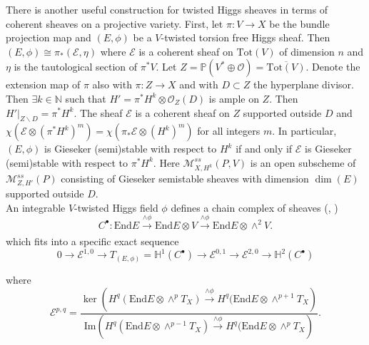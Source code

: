 \documentclass[12pt]{amsart}
\theoremstyle{definition}
\theoremstyle{remark}
\numberwithin{equation}{section}
\begin{document}
There is another useful construction for twisted Higgs sheaves in terms of coherent sheaves on a projective variety. First, let $\pi:V\to X$ be the bundle projection map and $(E, \phi)$ be a $V$-twisted torsion free Higgs sheaf. Then $(E, \phi) \cong \pi_*(\mathcal{E}, \eta)$ where $\mathcal{E}$ is a coherent sheaf on $\mbox{Tot}(V)$ of dimension $n$ and $\eta$ is the tautological section of $\pi^*V$. Let $Z = \mathbb{P}(V^*\oplus\mathcal{O}) = \overline{\mbox{Tot}(V)}$. Denote the extension map of $\pi$ also with $\pi:Z\to X$ and with $D\subset Z$ the hyperplane divisor. Then $\exists k\in\mathbb{N}$ such that $H' = \pi^*H^k\otimes\mathcal{O}_Z(D)$ is ample on $Z$. Then $H'|_{Z\backslash D} = \pi^*H^k$. The sheaf $\mathcal{E}$ is a coherent sheaf on $Z$ supported outside $D$ and $\chi(\mathcal{E}\otimes(\pi^*H^k)^m) = \chi(\pi_*\mathcal{E}\otimes (H^k)^m)$ for all integers $m$. In particular, $(E, \phi)$ is Gieseker (semi)stable with respect to $H^k$ if and only if $\mathcal{E}$ is Gieseker (semi)stable with respect to $\pi^*H^k$. Here $\mathcal{M}_{X, H^k}^{ss}(P, V)$ is an open subscheme of $\mathcal{M}_{Z, H'}^{ss}(P)$ consisting of Gieseker semistable sheaves with dimension $\dim(E)$ supported outside $D$.\\ 

An integrable $V$-twisted Higgs field $\phi$ defines a chain complex of sheaves (\cite{Simp2}, \cite{Ste3})
\begin{equation}
C^\bullet: \mbox{End}E\xrightarrow[]{\wedge\phi}\mbox{End}E\otimes V\xrightarrow[]{\wedge\phi}\mbox{End}E\otimes\wedge^2 V.
\end{equation}
which fits into a specific exact sequence 
\begin{equation}
0\to\mathcal{E}^{1,0}\to T_{(E,\phi)} =\mathbb{H}^1(C^\bullet)\to\mathcal{E}^{0,1}\to\mathcal{E}^{2,0}\to \mathbb{H}^2(C^\bullet) 
\end{equation}

where 
\begin{equation}
\mathcal{E}^{p,q} = \frac{\ker\left(H^q(\mbox{End}E\otimes\wedge^pT_X)\xrightarrow[]{\wedge\phi} H^q(\mbox{End}E\otimes\wedge^{p+1}T_X\right)}{\mbox{Im}\left(H^q(\mbox{End}E\otimes\wedge^{p-1}T_X)\xrightarrow[]{\wedge\phi} H^q(\mbox{End}E\otimes\wedge^{p}T_X\right)}.\end{equation}
\end{document}
